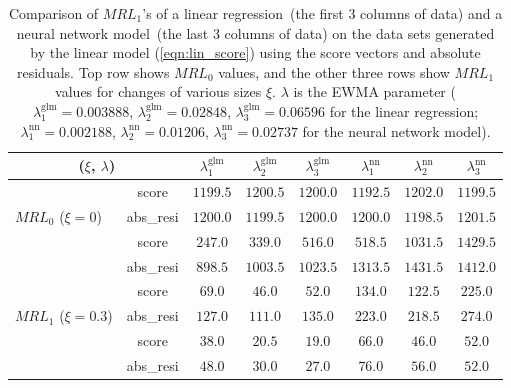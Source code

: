 \documentclass[twoside,11pt]{article}
\begin{document}
\begin{appendices}
\begin{table}[H]
\centering
\begin{tabular}{lc|ccc|ccc}
\toprule
\multicolumn{2}{c|}{($ \xi$, $ \lambda$)} & {$  \lambda_1^{\text{glm}}$} & {$ \lambda_2^{\text{glm}}$} & {$ \lambda_3^{\text{glm}}$} & {$  \lambda_1^{\text{nn}}$} & {$ \lambda_2^{\text{nn}}$} & {$ \lambda_3^{\text{nn}}$} \\
\toprule
\multirow{3}{*}{$MRL_0$ ($ \xi=0$)} & score &$1199.5$ & $1200.5$ & $1200.0$ &$1192.5$ & $1202.0$ & $1199.5$\\
& abs\_resi &$1200.0$ & $1199.5$ & $1200.0$ &$1200.0$ & $1198.5$ & $1201.5$\\
\midrule
\midrule
\multirow{3}{*}{$MRL_1$ ($\xi=0.1$)} & score &$\bm{247.0}$ & $\bm{339.0}$ & $\bm{516.0}$ &$\bm {518.5}$ & $\bm{1031.5}$ & $1429.5$\\
& abs\_resi &$898.5$ & $1003.5$ & $1023.5$ &$1313.5$ & $1431.5$ & $\bm{1412.0}$\\
\midrule
\multirow{3}{*}{$MRL_1$ ($\xi=0.3$)} & score &$\bm{69.0}$ & $\bm{46.0}$ & $\bm{52.0}$ &$\bm{134.0}$ & $\bm{122.5}$ & $\bm{225.0}$\\
& abs\_resi &$127.0$ & $111.0$ & $135.0$ &$223.0$ & $218.5$ & $274.0$\\
\midrule
\multirow{3}{*}{$MRL_1$ ($\xi=0.5$)} & score &$\bm{38.0}$ & $\bm{20.5}$ & $\bm{19.0}$ &$\bm{66.0}$ & $\bm{46.0}$ & ${52.0}$ \\
& abs\_resi &$48.0$ & $30.0$ & $27.0$ &$76.0$ & $56.0$ & $52.0$ \\
\midrule
\end{tabular}
\caption{Comparison of $MRL_1$'s of a linear regression~(the first $3$ columns of data) and a neural network model~(the last $3$ columns of data) on the data sets generated by the linear model (\ref{eqn:lin_score}) using the score vectors and absolute residuals. Top row shows $MRL_0$ values, and the other three rows show $MRL_1$ values for changes of various sizes $\xi$. $ \lambda$ is the EWMA parameter ({$ \lambda_1^{\text{glm}} = 0.003888$}, {$ \lambda_2^{\text{glm}} = 0.02848$}, {$ \lambda_3^{\text{glm}} =0.06596$} for the linear regression; {$ \lambda_1^{\text{nn}}=0.002188$}, {$ \lambda_2^{\text{nn}}=0.01206$}, {$ \lambda_3^{\text{nn}}=0.02737$} for the neural network model).}
\label{tab:lin_MRL}
\end{table}



\end{appendices}
\end{document}
